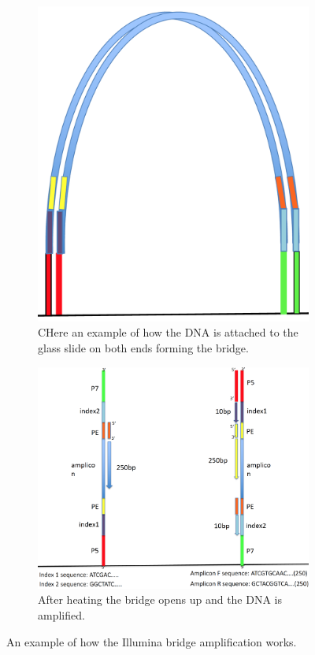 \begin{figure}[h]
    \centering
    \begin{subfigure}{0.35\textwidth}
        \includegraphics[width=\linewidth]{Figures/Bridge1.png}
        \caption{CHere an example of how the DNA is attached to the glass slide on both ends forming the bridge.}
    \end{subfigure}
    \hfill
    \begin{subfigure}{0.55\textwidth}
        \includegraphics[width=\linewidth]{Figures/Bridge2.png}
        \caption{After heating the bridge opens up and the DNA is amplified.}
    \end{subfigure}
    \caption{An example of how the Illumina bridge amplification works.}
    \label{fig:BridgeAmpl}
\end{figure}

